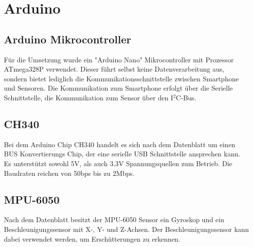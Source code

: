 \section{Arduino}

\subsection*{Arduino Mikrocontroller}
Für die Umsetzung wurde ein "Arduino Nano" Mikrocontroller mit Prozessor ATmega328P verwendet. Dieser führt selbst keine Datenverarbeitung aus, sondern bietet lediglich die Kommunikationsschnittstelle zwischen Smartphone und Sensoren. Die Kommunikation zum Smartphone erfolgt über die Serielle Schnittstelle, die Kommunikation zum Sensor über den I$^2$C-Bus. 


\subsection*{CH340}
Bei dem Arduino Chip CH340 handelt es sich nach dem Datenblatt \cite{CH340} um einen BUS Konvertierungs Chip, der eine serielle USB Schnittstelle ansprechen kann.
Es unterstützt sowohl 5V, als auch 3.3V Spannungsquellen zum Betrieb.
Die Baudraten reichen von 50bps bis zu 2Mbps.


\subsection*{MPU-6050}
Nach dem Datenblatt \cite{MPU6050} besitzt der MPU-6050 Sensor ein Gyroskop und ein Beschleunigungssensor mit X-, Y- und Z-Achsen.
Der Beschleunigungssensor kann dabei verwendet werden, um Erschütterungen zu erkennen.
